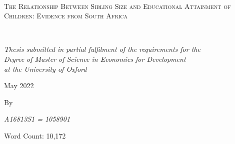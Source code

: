 \begin{titlepage}
	\centering
	\vspace*{1.5cm}
	\hrulefill\\
	\vspace{0.5cm}
	{\scshape\LARGE The Relationship Between Sibling Size and Educational Attainment of Children: Evidence from South Africa\par}
	\vspace{0.5cm}
	\hrulefill\\
	\vspace{1.5cm}

	{\normalsize\itshape Thesis submitted in partial fulfilment of the requirements for the\\
Degree of Master of Science in Economics for Development\\
at the University of Oxford\par}
	
	\vspace{0.6cm}

	\vspace{2.8cm}
	{\normalsize May 2022 \par}
	
	
	\vspace{1.2cm}
	{\normalsize By \par}
	
	\vspace{1.2cm}
	{\large\itshape A16813S1 = 1058901}
	
	
	\vspace{2.5cm}
	{\normalsize Word Count: 10,172}


\end{titlepage}